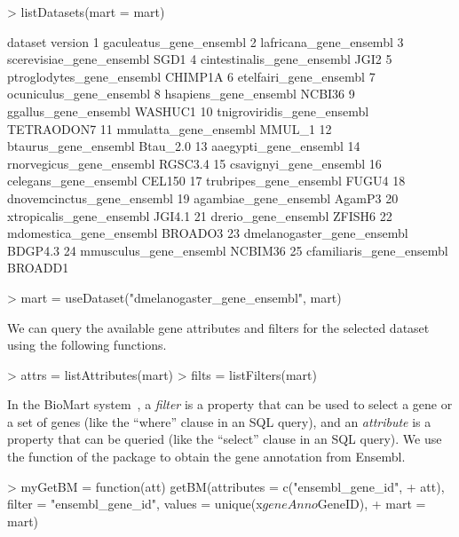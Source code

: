 \begin{Schunk}
\begin{Sinput}
> listDatasets(mart = mart)
\end{Sinput}
\begin{Soutput}
                      dataset    version
1     gaculeatus_gene_ensembl           
2      lafricana_gene_ensembl           
3    scerevisiae_gene_ensembl       SGD1
4  cintestinalis_gene_ensembl       JGI2
5   ptroglodytes_gene_ensembl    CHIMP1A
6      etelfairi_gene_ensembl           
7     ocuniculus_gene_ensembl           
8       hsapiens_gene_ensembl     NCBI36
9        ggallus_gene_ensembl    WASHUC1
10 tnigroviridis_gene_ensembl TETRAODON7
11      mmulatta_gene_ensembl     MMUL_1
12       btaurus_gene_ensembl   Btau_2.0
13      aaegypti_gene_ensembl           
14   rnorvegicus_gene_ensembl    RGSC3.4
15     csavignyi_gene_ensembl           
16      celegans_gene_ensembl     CEL150
17     trubripes_gene_ensembl      FUGU4
18 dnovemcinctus_gene_ensembl           
19      agambiae_gene_ensembl     AgamP3
20   xtropicalis_gene_ensembl     JGI4.1
21        drerio_gene_ensembl     ZFISH6
22    mdomestica_gene_ensembl    BROADO3
23 dmelanogaster_gene_ensembl    BDGP4.3
24     mmusculus_gene_ensembl    NCBIM36
25   cfamiliaris_gene_ensembl    BROADD1
\end{Soutput}
\end{Schunk}
%
\begin{Schunk}
\begin{Sinput}
> mart = useDataset("dmelanogaster_gene_ensembl", mart)
\end{Sinput}
\end{Schunk}
%
We can query the available gene attributes and filters for the
selected dataset using the following functions.
\begin{Schunk}
\begin{Sinput}
> attrs = listAttributes(mart)
> filts = listFilters(mart)
\end{Sinput}
\end{Schunk}
%
In the BioMart system~\cite{Kasprzyk2004}, a \emph{filter} is a
property that can be used to select a gene or a set of genes (like the
``where'' clause in an SQL query), and an \emph{attribute} is a
property that can be queried (like the ``select'' clause in an SQL
query). We use the  function of the package
 to obtain the gene annotation from Ensembl.
%
\begin{Schunk}
\begin{Sinput}
> myGetBM = function(att) getBM(attributes = c("ensembl_gene_id", 
+     att), filter = "ensembl_gene_id", values = unique(x$geneAnno$GeneID), 
+     mart = mart)
\end{Sinput}
\end{Schunk}
